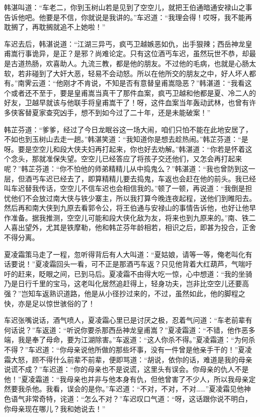 \documentclass[12pt,oneside]{book}
\begin{document}
韩湛叫道：``车老二，你到玉树山若是见到了空空儿，就把王伯通暗通安禄山之事告诉他吧。他要是不信，你就说是我讲的。''车迟道：``我理会得！哎呀，我不能再耽搁了，再耽搁就追不上她啦！''

车迟去后，韩湛说道：``江湖三异丐，疯丐卫越嫉恶如仇，出手狠辣；西岳神龙皇甫嵩行事诡异，是正？是邪？尚难论定。只有这位酒丐车迟，虽然玩世不恭，却最是古道热肠，欢喜助人。九流三教，都是他的朋友。不过他的毛病，也就是心肠太软，若非碰到了大奸大恶，轻易不会动怒。所以在他所交的朋友之中，好人坏人都有。''南霁云道：``他刚才不肯说，不知是否有意替皇甫嵩隐恶？''韩湛道：``我看这个或者还不至于，要是皇甫嵩当真干了那件血案，疯丐卫越和他都是夏、冷二人的好友，卫越早就该与他联手将皇甫嵩干了！呀，这件血案当年轰动武林，也曾有许多侠客替夏家查究凶手，想不到如今过了二十年，还是未能破案！''

韩芷芬道：``爹爹，经过了今日龙眠谷这一场大闹，咱们只怕不能在此地安居了，不如也到玉树山去走一趟。''韩湛笑道：``我知道你是想去趁热闹。''韩芷芬道：``是呀。要是空空儿和段大侠夫妇再打起来，你也好去劝解。''韩湛道：``你若是怀着这个念头，那就准保失望。空空儿已经答应了将孩子交还他们，又怎会再打起来呢？''韩芷芬道：``你不怕他的师弟精精儿从中捣鬼么？''韩湛道：``我也曾防到这一层，但酒丐车迟已经去了，即算精精儿要去捣鬼，车返也会赶在他的前头。我已经叫车迟替我传话，空空儿不信车迟也会相信我的。''顿了一顿，再说道：``我倒是担忧他们不会放过南大侠与铁少寨主，所以我打算今晚连夜起程，送他们到睢阳去。然后再和南大侠到九原去看郭令公，将王伯通与安禄山的事情告诉他，也好让他早作准备。据我推测，空空儿可能和段大侠化敌为友，将来也到九原来的。''南、铁二人喜出望外，尤其是铁摩勒，他和韩芷芬年龄相若，相识之后，即甚为投合，正舍不得分离。

夏凌霜策马走了一程，忽听得背后有人大叫道：``夏姑娘，请等一等，俺老叫化有话要说！''夏凌霜回头一看，可不正是那酒丐车返？只见他背着大红葫芦，气喘吁吁的赶来，眨眼之间，已到马后。夏凌霜不由得大吃一惊，心中想道：``我的坐骑乃是日行千里的宝马，这老叫化居然追赶得上，轻身功夫，岂非比空空儿还要高强？''岂知车返熟识道路，他是从小径抄过来的，不过，虽然如此，他的脚程之快，亦是足以惊世骇俗的了！

车迟张嘴说话，酒气喷人，夏凌霜心里已是讨厌之极，忍着气问道：``车老前辈有何话说？''车返道：``听说你要杀那西岳神龙皇甫嵩？''夏凌霜道：``不错，他作恶多端，我是奉了母命，要为江湖除害。''车返道：``这人你杀不得。''夏凌霜道：``为何杀不得？''车迟道：``你母亲说他所做的那些坏事，没有一件曾是他亲手干的！''夏凌霜大怒，顾不得什么前辈不前辈，便即骂道：``胡说，依你的话，难道是我的母亲说谎不成？''车迟道：``你的母亲也不是说谎，这里头有误会。你母亲的仇人不是他！''夏凌霜道：``我母亲也并非与他本身有仇，但他曾害了不少人，所以我母亲定然要我杀他。我看，误会的是你。''车迟道：``不对，不对，不对\ldots\ldots{}''夏凌霜见他神色语气非常奇特，诧道：``怎么不对？''车迟叹口气道：``呀，这话跟你说不明白，你母亲现在哪儿？我和她说去！''
\end{document}
